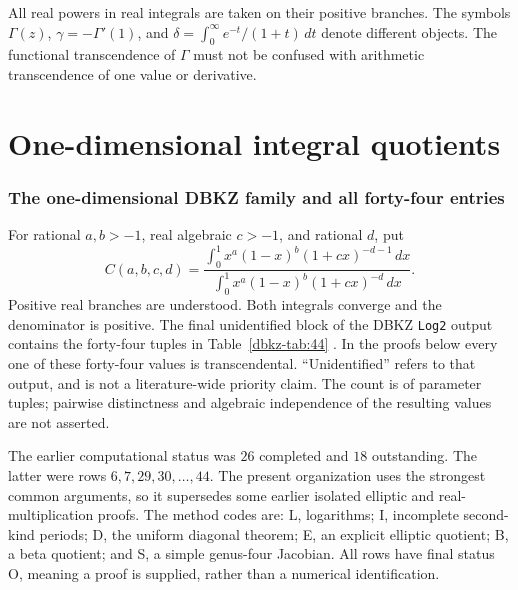 \documentclass[11pt,a4paper]{article}
\theoremstyle{definition}
\theoremstyle{remark}
\numberwithin{equation}{section}
\begin{document}
All real powers in real integrals are taken on their positive branches.
The symbols $\Gamma(z)$, $\gamma=-\Gamma'(1)$, and
$\delta=\int_0^\infty e^{-t}/(1+t)\,dt$ denote different objects.
The functional transcendence of $\Gamma$ must not be confused with arithmetic
transcendence of one value or derivative.


\clearpage
\begingroup
\small
\setlength{\parskip}{0pt}
\tableofcontents
\endgroup
\clearpage

\part{One-dimensional integral quotients}
\section{The one-dimensional DBKZ family and all forty-four entries}
\label{dbkz-sec:family}
For rational $a,b>-1$, real algebraic $c>-1$, and rational $d$, put
\[
 C(a,b,c,d)=\frac{\int_0^1x^a(1-x)^b(1+cx)^{-d-1}\,dx}
 {\int_0^1x^a(1-x)^b(1+cx)^{-d}\,dx}.
\]
Positive real branches are understood. Both integrals converge and the
denominator is positive. The final unidentified block of the DBKZ
\texttt{Log2} output contains the forty-four tuples in
Table~\ref{dbkz-tab:44} \cite{dbkz-source}. In the proofs below every one
of these forty-four values is transcendental. ``Unidentified'' refers to
that output, and is not a literature-wide priority claim. The count is
of parameter tuples; pairwise distinctness and algebraic independence
of the resulting values are not asserted.

The earlier computational status was $26$ completed and $18$ outstanding.
The latter were rows $6,7,29,30,\ldots,44$. The present organization uses
the strongest common arguments, so it supersedes some earlier isolated
elliptic and real-multiplication proofs. The method codes are: L,
logarithms; I, incomplete second-kind periods; D, the uniform diagonal
theorem; E, an explicit elliptic quotient; B, a beta quotient; and S,
a simple genus-four Jacobian. All rows have final status O, meaning a
proof is supplied, rather than a numerical identification.
\end{document}
